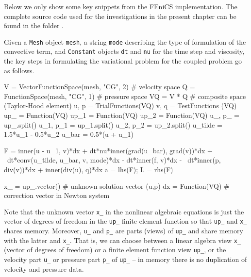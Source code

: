 Below we only show some key snippets from the FEniCS implementation.
The complete source code used for the investigations in the present chapter
can be found in the folder \cite{MortensenMardal2010}.

Given a {\fontsize{12pt}{12pt}\texttt{Mesh}} object {\fontsize{12pt}{12pt}\texttt{mesh}}, a string {\fontsize{12pt}{12pt}\texttt{mode}} describing the
type of formulation of the convective term, and {\fontsize{12pt}{12pt}\texttt{Constant}} objects
{\fontsize{12pt}{12pt}\texttt{dt}} and {\fontsize{12pt}{12pt}\texttt{nu}} for the time step and viscosity, the key steps in formulating the variational
problem for the coupled problem go as follows.
\begin{python}
V = VectorFunctionSpace(mesh, "CG", 2)  # velocity space
Q = FunctionSpace(mesh, "CG", 1)        # pressure space
VQ = V * Q  # composite space (Taylor-Hood element)
u, p = TrialFunctions(VQ)
v, q = TestFunctions (VQ)
up_   = Function(VQ)
up_1  = Function(VQ)
up_2  = Function(VQ)
u_, p_ = up_.split()
u_1, p_1 = up_1.split()
u_2, p_2 = up_2.split()
u_tilde = 1.5*u_1 - 0.5*u_2
u_bar = 0.5*(u + u_1)

F  = inner(u - u_1, v)*dx + dt*nu*inner(grad(u_bar), grad(v))*dx + \
     dt*conv(u_tilde, u_bar, v, mode)*dx - dt*inner(f, v)*dx - \
     dt*inner(p, div(v))*dx + inner(div(u), q)*dx
a = lhs(F); L = rhs(F)

x_ = up_.vector()   # unknown solution vector (u,p)
dx = Function(VQ)  # correction vector in Newton system
\end{python}
Note that the unknown vector {\fontsize{12pt}{12pt}\verb!x_!} in the nonlinear algebraic
equations is just the vector of degrees of freedom in the
{\fontsize{12pt}{12pt}\verb!up_!} finite element function so that {\fontsize{12pt}{12pt}\verb!up_!} and {\fontsize{12pt}{12pt}\verb!x_!}
shares memory. Moreover, {\fontsize{12pt}{12pt}\verb!u_!} and {\fontsize{12pt}{12pt}\verb!p_!} are parts (views)
of {\fontsize{12pt}{12pt}\verb!up_!} and share memory with the latter and {\fontsize{12pt}{12pt}\verb!x_!}.
That is, we can choose between a linear algebra view {\fontsize{12pt}{12pt}\verb!x_!}
(vector of degrees of freedom) or a finite element function view {\fontsize{12pt}{12pt}\verb!up_!},
or the velocity part {\fontsize{12pt}{12pt}\verb!u_!} or pressure part {\fontsize{12pt}{12pt}\verb!p_!} of {\fontsize{12pt}{12pt}\verb!up_!} --
in memory there is no duplication of velocity and pressure data.

